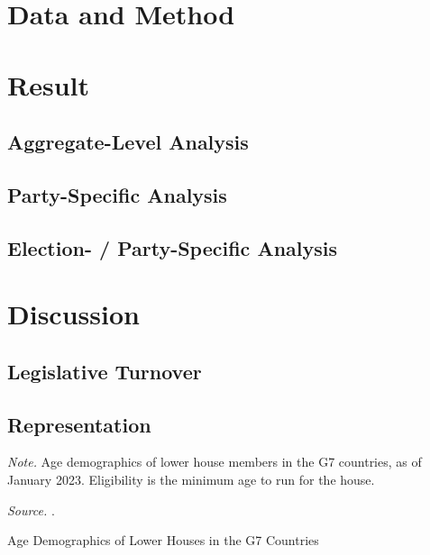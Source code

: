 \documentclass[a4paper, 11pt]{article}
\begin{document}
\section{Data and Method} \label{sec: emp}


\section{Result} \label{sec: res}

\subsection{Aggregate-Level Analysis}


\subsection{Party-Specific Analysis}


\subsection{Election- / Party-Specific Analysis}


\section{Discussion} \label{sec: dis}


\subsection{Legislative Turnover}


\subsection{Representation}


\begin{table}[htbp]
\begin{center}
\begin{threeparttable}

\begin{tablenotes}[flushleft]
  \scriptsize{
    \item{\textit{Note.} Age demographics of lower house members in the G7 countries, as of January 2023. Eligibility is the minimum age to run for the house.}
    \item{\textit{Source.} \citet{inter-parliamentaryunionDataAgeCountry2024}.}
  }
\end{tablenotes}
\end{threeparttable}
\caption{Age Demographics of Lower Houses in the G7 Countries}
\label{table:intl}
\end{center}
\end{table}
\end{document}
